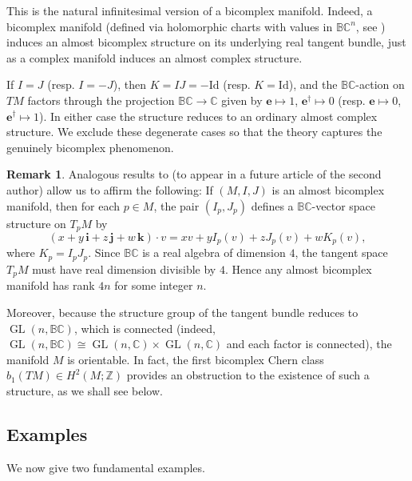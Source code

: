 \documentclass[11pt]{amsart}
\newcommand{\BC}{\mathbb{BC}}       %
\newcommand{\C}{\mathbb{C}}          %
\newcommand{\Z}{\mathbb{Z}}
\newcommand{\iunit}{\mathbf{i}}      %
\newcommand{\junit}{\mathbf{j}}      %
\newcommand{\kunit}{\mathbf{k}}      %
\newcommand{\GL}{\operatorname{GL}}  %
\theoremstyle{definition}
\newtheorem{remark}[prop]{Remark}            %
\begin{document}
This is the natural infinitesimal version of a bicomplex manifold. Indeed, a bicomplex manifold (defined via holomorphic charts with values in $\BC^n$, see \cite{bra-rab-rom-bicomplex}) induces an almost bicomplex structure on its underlying real tangent bundle, just as a complex manifold induces an almost complex structure.

If $I=J$ (resp. $I=-J$), then $K=IJ=-\mathrm{Id}$ (resp. $K=\mathrm{Id}$), and the $\mathbb{BC}$-action on $TM$ factors through the projection $\mathbb{BC}\to\mathbb{C}$ given by $\mathbf{e}\mapsto 1$, $\mathbf{e}^{\dagger}\mapsto 0$ (resp. $\mathbf{e}\mapsto 0$, $\mathbf{e}^{\dagger}\mapsto 1$). In either case the structure reduces to an ordinary almost complex structure. We exclude these degenerate cases so that the theory captures the genuinely bicomplex phenomenon.

\begin{remark}
    Analogous results to \cite[Appendix~A]{hodge-theory} (to appear in a future article of the second author) allow us to affirm the following: If $(M,I,J)$ is an almost bicomplex manifold, then for each $p \in M$, the pair $(I_p, J_p)$ defines a $\BC$-vector space structure on $T_pM$ by
    \begin{equation*}
        (x + y\,\iunit + z\,\junit + w\,\kunit) \cdot v
        = x v + y I_p(v) + z J_p(v) + w K_p(v),
    \end{equation*}
    where $K_p = I_p J_p$. Since $\BC$ is a real algebra of dimension $4$, the tangent space $T_pM$ must have real dimension divisible by $4$. Hence any almost bicomplex manifold has rank $4n$ for some integer $n$.

    Moreover, because the structure group of the tangent bundle reduces to $\GL(n,\BC)$, which is connected (indeed, $\GL(n,\BC) \cong \GL(n,\C) \times \GL(n,\C)$ and each factor is connected), the manifold $M$ is orientable. In fact, the first bicomplex Chern class $b_1(TM) \in H^2(M;\Z)$ provides an obstruction to the existence of such a structure, as we shall see below.
\end{remark}

\subsection{Examples}

We now give two fundamental examples.
\end{document}
